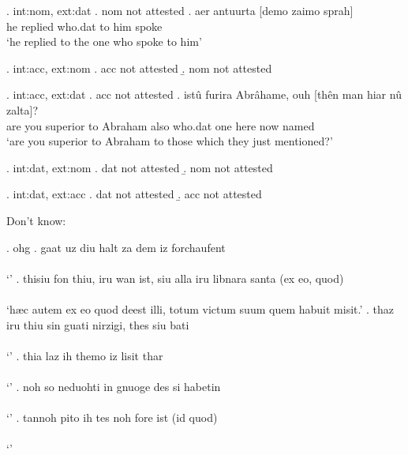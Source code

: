 \ex. \ac{int}:\ac{nom}, \ac{ext}:\ac{dat}
\a. \ac{nom} not attested
\bg. aer antuurta [demo zaimo sprah]\\
 he replied\scsub{[dat]} who.\ac{dat} {to him} spoke\scsub{[nom]}\\
 `he replied to the one who spoke to him' 

\ex. \ac{int}:\ac{acc}, \ac{ext}:\ac{nom}
\a. \ac{acc} not attested
\b. \ac{nom} not attested

\ex. \ac{int}:\ac{acc}, \ac{ext}:\ac{dat}
\a. \ac{acc} not attested
\bg. istû furira Abrâhame, ouh [thên man hiar nû zalta]?\\
 {are you} superior\scsub{[dat]} {to Abraham} also who.\ac{dat} one here now named\scsub{[acc]}\\
 `are you superior to Abraham to those which they just mentioned?' 

\ex. \ac{int}:\ac{dat}, \ac{ext}:\ac{nom}
\a. \ac{dat} not attested
\b. \ac{nom} not attested

\ex. \ac{int}:\ac{dat}, \ac{ext}:\ac{acc}
\a. \ac{dat} not attested
\b. \ac{acc} not attested



Don't know:

\ex. \ac{ohg}
\ag. gaat uz diu halt za dem iz forchaufent\\
 \\
 `' 
\bg. thisiu fon thiu, iru wan ist, siu alla iru libnara santa (ex eo, quod)\\
 \\
 `hæc autem ex eo quod deest illi, totum victum suum quem habuit misit.' 
\bg. thaz iru thiu sin guati nirzigi, thes siu bati\\
 \\
 `' 
\bg. thia laz ih themo iz lisit thar\\
 \\
 `' 
\bg. noh so neduohti in gnuoge des si habetin\\
 \\
 `' 
\bg. tannoh pito ih tes noh fore ist (id quod)\\
 \\
 `' 

